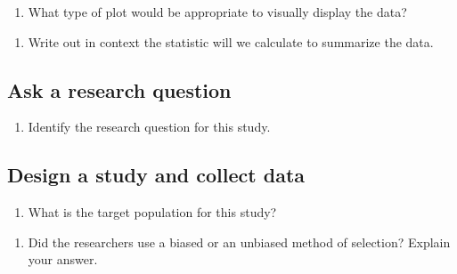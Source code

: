 \documentclass[
]{report}
\providecommand{\tightlist}{%
  \setlength{\itemsep}{0pt}\setlength{\parskip}{0pt}}
\begin{document}
\vspace{0.5in}

\begin{enumerate}
\def\labelenumi{\arabic{enumi}.}
\setcounter{enumi}{2}
\tightlist
\item
  What type of plot would be appropriate to visually display the data?
\end{enumerate}

\vspace{0.5in}

\begin{enumerate}
\def\labelenumi{\arabic{enumi}.}
\setcounter{enumi}{3}
\tightlist
\item
  Write out in context the statistic will we calculate to summarize the data.
\end{enumerate}

\vspace{0.5in}

\hypertarget{ask-a-research-question}{%
\subsection*{Ask a research question}\label{ask-a-research-question}}

\begin{enumerate}
\def\labelenumi{\arabic{enumi}.}
\setcounter{enumi}{4}
\tightlist
\item
  Identify the research question for this study.
\end{enumerate}

\vspace{1in}

\hypertarget{design-a-study-and-collect-data}{%
\subsection*{Design a study and collect data}\label{design-a-study-and-collect-data}}

\begin{enumerate}
\def\labelenumi{\arabic{enumi}.}
\setcounter{enumi}{5}
\tightlist
\item
  What is the target population for this study?
\end{enumerate}

\vspace{0.5in}

\begin{enumerate}
\def\labelenumi{\arabic{enumi}.}
\setcounter{enumi}{6}
\tightlist
\item
  Did the researchers use a biased or an unbiased method of selection? Explain your answer.
\end{enumerate}
\end{document}
